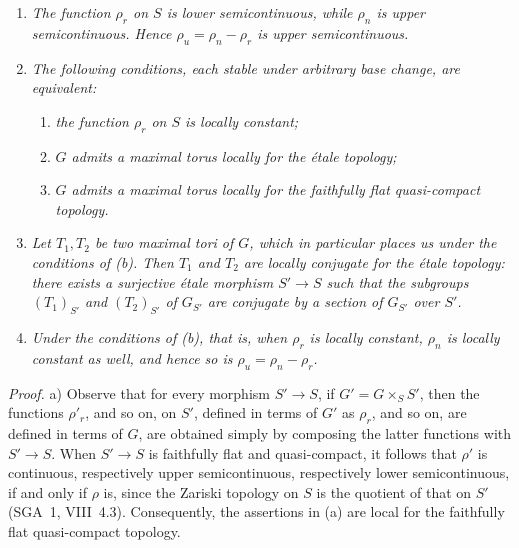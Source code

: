 \begin{enumerate}
\renewcommand{\labelenumi}{\alph{enumi})}
\item{} \emph{The function \(\rho_r\) on \(S\) is lower
  semicontinuous, while \(\rho_n\) is upper semicontinuous. Hence
  \(\rho_u=\rho_n-\rho_r\) is upper semicontinuous.}

\item{} \emph{The following conditions, each stable under arbitrary
  base change, are equivalent:}
  \begin{enumerate}
  \renewcommand{\labelenumii}{(\roman{enumii})}
  \item \emph{the function \(\rho_r\) on \(S\) is locally constant;}
  \item \emph{\(G\) admits a maximal torus locally for the étale
    topology;}
  \item[\textup{(ii bis)}] \emph{\(G\) admits a maximal torus locally
    for the faithfully flat quasi-compact topology.}
  \end{enumerate}

\item \emph{Let \(T_1,T_2\) be two maximal tori of \(G\), which in
  particular places us under the conditions of (b). Then \(T_1\) and
  \(T_2\) are locally conjugate for the étale topology: there exists a
  surjective étale morphism \(S'\to S\) such that the subgroups
  \((T_1)_{S'}\) and \((T_2)_{S'}\) of \(G_{S'}\) are conjugate by a
  section of \(G_{S'}\) over \(S'\).}

\item \emph{Under the conditions of (b), that is, when \(\rho_r\) is
  locally constant, \(\rho_n\) is locally constant as well, and hence
  so is \(\rho_u=\rho_n-\rho_r\).}
\end{enumerate}

\emph{Proof.}
a) Observe that for every morphism \(S'\to S\), if
\(G'=G\times_S S'\), then the functions \(\rho'_r\), and so on, on
\(S'\), defined in terms of \(G'\) as \(\rho_r\), and so on, are
defined in terms of \(G\), are obtained simply by composing the latter
functions with \(S'\to S\). When \(S'\to S\) is faithfully flat and
quasi-compact, it follows that \(\rho'\) is continuous, respectively
upper semicontinuous, respectively lower semicontinuous, if and only
if \(\rho\) is, since the Zariski topology on \(S\) is the quotient of
that on \(S'\) (SGA~1, VIII~4.3). Consequently, the assertions in (a)
are local for the faithfully flat quasi-compact topology.

